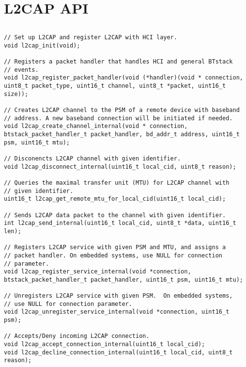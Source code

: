 \section{L2CAP API}
\label{appendix:api_l2cap}
$ $
\begin{lstlisting}
// Set up L2CAP and register L2CAP with HCI layer.
void l2cap_init(void);

// Registers a packet handler that handles HCI and general BTstack
// events.
void l2cap_register_packet_handler(void (*handler)(void * connection, uint8_t packet_type, uint16_t channel, uint8_t *packet, uint16_t size));

// Creates L2CAP channel to the PSM of a remote device with baseband
// address. A new baseband connection will be initiated if needed.
void l2cap_create_channel_internal(void * connection, btstack_packet_handler_t packet_handler, bd_addr_t address, uint16_t psm, uint16_t mtu);

// Disconencts L2CAP channel with given identifier. 
void l2cap_disconnect_internal(uint16_t local_cid, uint8_t reason);

// Queries the maximal transfer unit (MTU) for L2CAP channel with
// given identifier. 
uint16_t l2cap_get_remote_mtu_for_local_cid(uint16_t local_cid);

// Sends L2CAP data packet to the channel with given identifier.
int l2cap_send_internal(uint16_t local_cid, uint8_t *data, uint16_t len);

// Registers L2CAP service with given PSM and MTU, and assigns a
// packet handler. On embedded systems, use NULL for connection
// parameter.
void l2cap_register_service_internal(void *connection, btstack_packet_handler_t packet_handler, uint16_t psm, uint16_t mtu);

// Unregisters L2CAP service with given PSM.  On embedded systems,
// use NULL for connection parameter.
void l2cap_unregister_service_internal(void *connection, uint16_t psm);

// Accepts/Deny incoming L2CAP connection.
void l2cap_accept_connection_internal(uint16_t local_cid);
void l2cap_decline_connection_internal(uint16_t local_cid, uint8_t reason);
\end{lstlisting}
\pagebreak